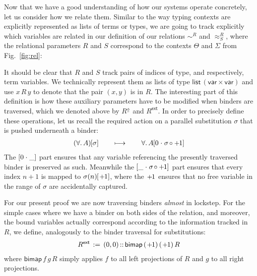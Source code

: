 \documentclass[a4paper,UKenglish]{lipics-v2016}
\newcommand{\ms}{\,}
\newcommand{\mrel}[1]{\mathrel{\ms #1 \ms}}
\newcommand{\eqdef}{\mrel{:=}}
\newcommand{\ty}{\mathsf{ty}}
\newcommand{\tm}{\mathsf{tm}}
\newcommand{\tyr}{\mathrel{\sim}}
\newcommand{\tmr}{\mathrel{\approx}}
\newcommand{\Rext}[1]{\ensuremath{#1^{\mathsf{ext}}}}
\newcommand{\Rshift}[1]{\ensuremath{#1^{\Uparrow}}}
\newcommand{\Prp}{\ensuremath{\textrm{\textasteriskcentered}}}
\newcommand{\All}{\ensuremath{\forall.\,}}
\newcommand{\Lam}[1]{\ensuremath{\lambda #1.\,}}
\newcommand{\TyLam}{\ensuremath{\Lambda.\,}}
\newcommand{\Prod}[1]{\ensuremath{\Pi #1.\,}}
\newcommand{\subst}[1]{\hphantom{|}\!\![{#1}]}
\newcommand{\scons}{\mathbin{\hspace{0.05em}\cdot\hspace{0.05em}}}
\newcommand{\scomp}{\mathbin{\hspace{-0.1em}{\circ}\hspace{-0.1em}}}
\newcommand{\shift}{\ensuremath{\hspace{0.1em}\mathsf{+}\hspace{0.08em}\!1}}
\theoremstyle{plain}
\begin{document}
Now that we have a good understanding of how our systems operate concretely, let us consider how we relate them.
Similar to the way typing contexts are explicitly represented as lists of terms or types, we are going to track explicitly which variables are related in our definition of our relations $\tyr^R$ and $\tmr^R_S$, where the relational parameters $R$ and $S$ correspond to the contexts $\Theta$ and $\Sigma$ from Fig.~\ref{fig:rel}:
{\small
{}
}
It should be clear that $R$ and $S$ track pairs of indices of type, and respectively, term variables.
We technically represent them as lists of type $\mathsf{list}\,(\mathsf{var} \times \mathsf{var})$ and use $x\,R\,y$ to denote that the pair $(x,y)$ is in $R$.
The interesting part of this definition is how these auxiliary parameters have to be modified when binders are traversed, which we denoted above by $\Rshift{R}$ and $\Rext{R}$.
In order to precisely define these operations, let us recall the required action on a parallel substitution $\sigma$ that is pushed underneath a binder:
\begin{align*}
  (\All A)\subst{\sigma} \qquad\longmapsto\qquad \All A\subst{0 \scons \sigma \scomp \shift}
\end{align*}
The $\subst{0 \scons \_}$ part ensures that any variable referencing the presently traversed binder is preserved as such.
Meanwhile the $\subst{\_ \scons \sigma \scomp \shift}$ part ensures that every index $n + 1$ is mapped to $\sigma(n)\subst{\shift}$, where the $\shift$ ensures that no free variable in the range of $\sigma$ are accidentally captured.

For our present proof we are now traversing binders \emph{almost} in lockstep.
For the simple cases where we have a binder on both sides of the relation, and moreover, the bound variables actually correspond according to the information tracked in $R$, we define, analogously to the binder traversal for substitutions:
\begin{align*}
  \Rext{R} \eqdef (0,0) \mathop{::} \mathsf{bimap}\,(\shift)\,(\shift)\,R
\end{align*}
where $\mathsf{bimap}\,f\,g\,R$ simply applies $f$ to all left projections of $R$ and $g$ to all right projections.
\end{document}
